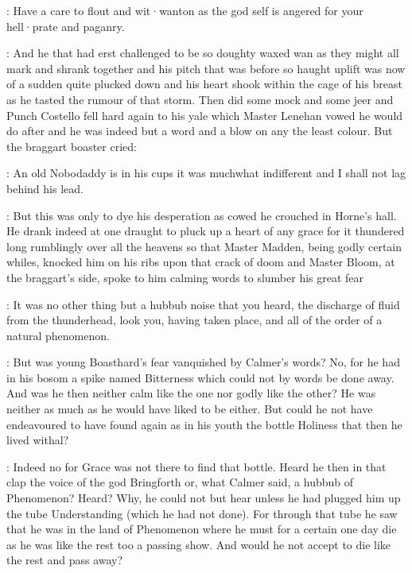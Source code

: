 \lynch:
Have a care to flout and wit·wanton as the god self is angered for
your hell·prate and paganry.

:
And he that had erst challenged to be so doughty waxed wan as they
might all mark and shrank together and his pitch that was before so haught
uplift was now of a sudden quite plucked down and his heart shook within
the cage of his breast as he tasted the rumour of that storm.
Then did
some mock and some jeer and Punch Costello fell hard again to his yale
which Master Lenehan vowed he would do after and he was indeed but a word
and a blow on any the least colour.
But the braggart boaster cried:

\stephen:
An old Nobodaddy is in his cups it was muchwhat indifferent and
I shall not lag behind his lead.

:
But this was only to dye his desperation as cowed he
crouched in Horne's hall.
He drank indeed at one draught to pluck up a
heart of any grace for it thundered long rumblingly over all the heavens
so that Master Madden,
being godly certain whiles,
knocked him on his
ribs upon that crack of doom and Master Bloom,
at the braggart's side,
spoke to him calming words to slumber his great fear

\Bloom:
It was no other thing but a hubbub noise that you heard,
the
discharge of fluid from the thunderhead,
look you,
having taken place,
and all of the order of a natural phenomenon.



:
But was young Boasthard's fear vanquished by Calmer's words?
No,
for he had in his bosom a spike named Bitterness
which could not by words be done away.
And was he then neither calm like the one nor godly
like the other?
He was neither as much as he would have liked to be
either.
But could he not have endeavoured to have found again as in his
youth the bottle Holiness that then he lived withal?

:
Indeed no for Grace was not there to find that bottle.
Heard he then
in that clap the voice of the god Bringforth or,
what Calmer said,
a
hubbub of Phenomenon?
Heard?
Why,
he could not but hear unless he had
plugged him up the tube Understanding
(which he had not done).
For through
that tube he saw that he was in the land of Phenomenon where he must for a
certain one day die as he was like the rest too a passing show.
And would he not accept to die like the rest and pass away?


